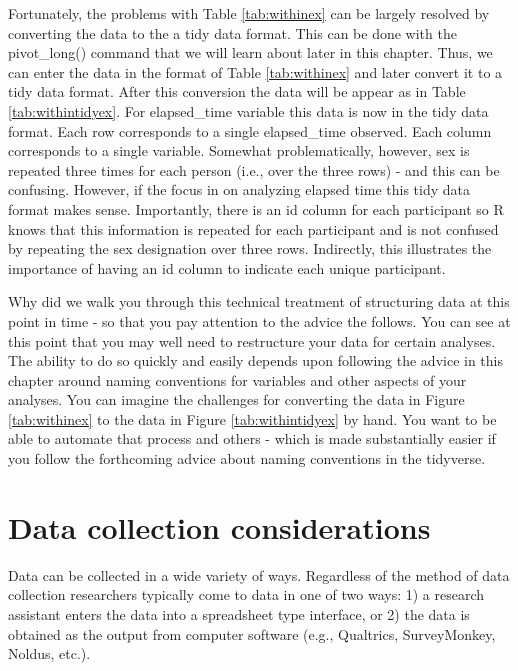 \documentclass[
]{krantz}
\begin{document}
\newpage

Fortunately, the problems with Table \ref{tab:withinex} can be largely resolved by converting the data to the a tidy data format. This can be done with the pivot\_long() command that we will learn about later in this chapter. Thus, we can enter the data in the format of Table \ref{tab:withinex} and later convert it to a tidy data format. After this conversion the data will be appear as in Table \ref{tab:withintidyex}. For elapsed\_time variable this data is now in the tidy data format. Each row corresponds to a single elapsed\_time observed. Each column corresponds to a single variable. Somewhat problematically, however, sex is repeated three times for each person (i.e., over the three rows) - and this can be confusing. However, if the focus in on analyzing elapsed time this tidy data format makes sense. Importantly, there is an id column for each participant so R knows that this information is repeated for each participant and is not confused by repeating the sex designation over three rows. Indirectly, this illustrates the importance of having an id column to indicate each unique participant.

Why did we walk you through this technical treatment of structuring data at this point in time - so that you pay attention to the advice the follows. You can see at this point that you may well need to restructure your data for certain analyses. The ability to do so quickly and easily depends upon following the advice in this chapter around naming conventions for variables and other aspects of your analyses. You can imagine the challenges for converting the data in Figure \ref{tab:withinex} to the data in Figure \ref{tab:withintidyex} by hand. You want to be able to automate that process and others - which is made substantially easier if you follow the forthcoming advice about naming conventions in the tidyverse.

\hypertarget{data-collection-considerations}{%
\section{Data collection considerations}\label{data-collection-considerations}}

Data can be collected in a wide variety of ways. Regardless of the method of data collection researchers typically come to data in one of two ways: 1) a research assistant enters the data into a spreadsheet type interface, or 2) the data is obtained as the output from computer software (e.g., Qualtrics, SurveyMonkey, Noldus, etc.).
\end{document}
